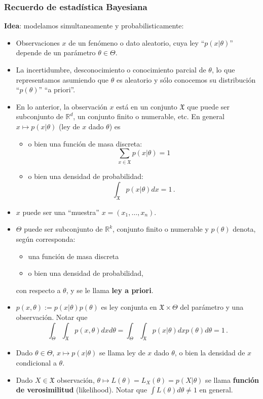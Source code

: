 \documentclass[letterpaper,11pt]{article} %
\theoremstyle{defbreak}
\theoremstyle{propbreak}
\theoremstyle{remark}
\theoremstyle{break}
\def\R{\mathbb{R}}
\begin{document}
\subsubsection{Recuerdo de estadística Bayesiana}
\textbf{Idea}: modelamos simultaneamente y probabilisticamente:
\begin{itemize}
    \item Observaciones $x$ de un fenómeno o dato aleatorio, cuya ley ``$p(x|\theta)$'' depende de un parámetro $\theta\in\Theta$.
    \item La incertidumbre, desconocimiento o conocimiento parcial de $\theta$, lo que representamos asumiendo que $\theta$ es aleatorio y sólo conocemos su distribución ``$p(\theta)$'' ``a priori''.
    \item En lo anterior, la observación $x$ está en un conjunto $\mathfrak{X}$ que puede ser subconjunto de $\R^d$, un conjunto finito o numerable, etc. 
    \newline En general $x\mapsto p(x|\theta)$ (ley de $x$ dado $\theta$) es
    \begin{itemize}
        \item o bien una función de masa discreta: 
        $$\displaystyle\sum_{x\in \mathfrak{X}}p(x|\theta)=1$$
        \item o bien una densidad de probabilidad: 
        $$\displaystyle\int_{\mathfrak{X}}p(x|\theta)dx=1\,.$$
    \end{itemize}
    \item $x$ puede ser una ``muestra'' $x=(x_1,\dots,x_n)$.
    \item $\Theta$ puede ser subconjunto de $\R^k$, conjunto finito o numerable y $p(\theta)$ denota, seg\'un corresponda:
    \begin{itemize}
        \item una función de masa discreta
        \item o bien una densidad de probabilidad,
    \end{itemize}
    con respecto a $\theta$,  y se le llama \textbf{ley a priori}.
    \item $p(x,\theta):=p(x|\theta)p(\theta)$ es ley conjunta en $\mathfrak{X}\times \Theta$ del parámetro y una observación.
    \newline Notar que
    $$ \displaystyle\int_\Theta\int_\mathfrak{X} p(x,\theta)dxd\theta=\int_\Theta\int_\mathfrak{X} p(x|\theta)dx p(\theta)d\theta=1\,.$$
    \item Dado $\theta\in\Theta$, $x\mapsto p(x|\theta)$ se llama ley de $x$ dado $\theta$, o bien la densidad de $x$ condicional a $\theta$.
    \item Dado $X\in\mathfrak{X}$ observación, $\theta\mapsto L(\theta)=L_X(\theta)=p(X|\theta)$ se llama \textbf{función de verosimilitud} (likelihood). Notar que $\int L(\theta)d\theta\neq1$ en general.
\end{itemize}
\end{document}
